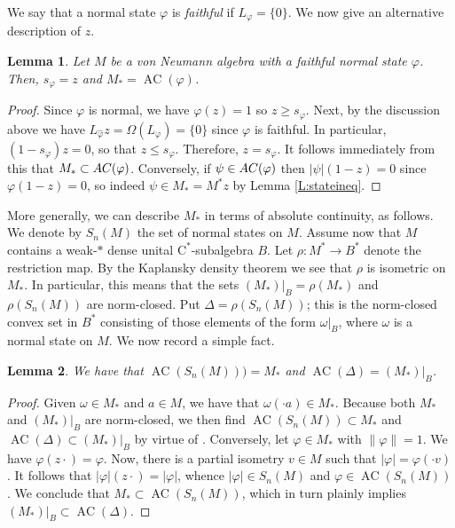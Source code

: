 \documentclass[10pt]{amsart}
\newcommand{\rC}{\mathrm{C}}
\renewcommand{\phi}{\varphi}
\newcommand{\AC}{\operatorname{AC}}
\newtheorem{lemma}{Lemma}[section]
\theoremstyle{definition}
\begin{document}
We say that a normal state $\phi$ is \emph{faithful} if $L_\phi=\{0\}$. We now give an alternative description of $z$.

\begin{lemma}\label{L:predualphi}
Let $M$ be a von Neumann algebra with a faithful normal state $\phi$. 
Then, $s_\phi=z$ and $M_*=\AC(\varphi)$.
\end{lemma}
\begin{proof}  
Since $\phi$ is normal, we have $\phi(z)=1$ so $z\geq s_\phi$. Next, by the discussion above we have $L_{\widehat\phi}z=\Omega(L_\phi)=\{0\}$ since $\phi$ is faithful. In particular, $(1-s_\phi)z=0$, so that $z\leq s_\phi$.  Therefore, $z=s_\phi$.
It follows immediately from this that $M_* \subset  {\rm AC}(\phi)$.  Conversely,  if $\psi \in {\rm AC}(\phi)$ then $|\psi| (1-z) = 0$ since $\phi(1-z) = 0$, so indeed $\psi\in M_*=M^*z$ by Lemma \ref{L:stateineq}.
\end{proof}

More generally, we can describe $M_*$ in terms of absolute continuity, as follows.
We  denote by  $S_n(M)$ the set of normal states on $M$.  Assume now that $M$ contains a weak-$*$ dense unital $\rC^*$-subalgebra $B$. Let $\rho:M^*\to B^*$ denote the restriction map. By the Kaplansky density theorem we see that $\rho$ is isometric on $M_*$. In particular, this means that the sets $(M_*)|_B=\rho(M_*)$ and  $\rho( S_n(M))$ are norm-closed. Put $\Delta=\rho(S_n(M))$; this is the norm-closed convex set
 in $B^*$
 consisting of those elements of the form $\omega|_B$, where $\omega$ is a normal state on $M$. We now record a simple fact.






\begin{lemma}\label{L:restnormal}
We have that $\AC(S_n(M)))=M_*$ and $\AC(\Delta)=(M_*)|_B$.
\end{lemma}
\begin{proof}
Given $\omega\in M_*$ and $a\in M$, we have that $\omega(\cdot a)\in M_*$. Because both $M_*$ and $(M_*)|_B$ are norm-closed, we then find $\AC(S_n(M))\subset M_*$ and $\AC(\Delta)\subset (M_*)|_B$ by virtue of \cite[Theorem 2.7]{CT2023Henkin}.  Conversely, let $\phi\in M_*$ with $\|\phi\|=1$. We have $\phi(z\cdot)=\phi$. Now, there is a partial isometry $v\in M$ such that $|\phi|=\phi(\cdot v)$. It follows that $|\phi|(z\cdot )=|\phi|$, whence $|\phi|\in S_n(M)$ and $\phi\in \AC(S_n(M))$. We conclude that  $M_*\subset \AC(S_n(M))$, which in turn plainly implies $(M_*)|_B\subset \AC(\Delta)$.
\end{proof}
\end{document}
